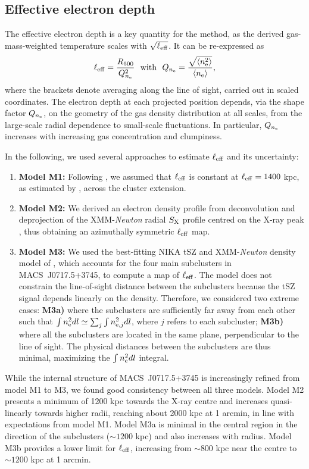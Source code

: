 \documentclass[twocolumn,traditabstract]{aa}
\def\xe {n_{\rm e}}
\begin{document}
\subsection{Effective electron depth}
The effective electron depth is a key quantity for the method, as the derived gas-mass-weighted temperature scales with $\sqrt{\ell_{\rm eff}}$. It can be re-expressed as
\begin{equation}
\ell_{\rm eff} = \frac{R_{500}}{Q_{n_{\rm e}}^2}~~{\rm with}~~Q_{n_{\rm e}} = \frac{ \sqrt{\langle \xe^2\rangle}}{ \langle\xe\rangle},
\label{eq:Q_ne}
\end{equation}
where the brackets denote averaging along the line of sight, carried out in scaled coordinates. The electron depth at each projected position depends, via the shape factor $Q_{n_{\rm e}}$, on the geometry of the gas density distribution at all scales, from the large-scale radial dependence to small-scale fluctuations. In particular, $Q_{n_{\rm e}}$ increases with increasing gas concentration and clumpiness.

In the following, we used several approaches to estimate $\ell_{\rm eff}$ and its uncertainty:
\begin{enumerate}
\item {\bf Model M1:} Following \cite{Sayers2013}, we assumed that $\ell_{\rm eff}$ is constant at $\ell_{\rm eff}=1400$ kpc, as estimated by \citet{Mroczkowski2012}, across the cluster extension. 
\item {\bf Model M2:} We derived an electron density profile from deconvolution and deprojection of the XMM-\textit{Newton} radial $S_{\rm X}$ profile centred on the X-ray peak \citep{Croston2006}, thus obtaining an azimuthally symmetric $\ell_{\rm eff}$ map. 
\item {\bf Model M3:} We used the best-fitting NIKA tSZ and XMM-\textit{Newton} density model of \cite{Adam2016b}, which accounts for the four main subclusters in \mbox{MACS~J0717.5+3745}, to compute a map of $\ell_{\rm eff}$. The model does not constrain the line-of-sight distance between the subclusters because the tSZ signal depends linearly on the density. Therefore, we considered two extreme cases: {\bf M3a)} where the subclusters are sufficiently far away from each other such that $\int n_{\rm e}^2 dl \simeq \sum_j \int n_{{\rm e},j}^2 dl$, where $j$ refers to each subcluster; {\bf M3b)} where all the subclusters are located in the same plane, perpendicular to the line of sight. The physical distances between the subclusters are thus minimal, maximizing the $\int n_{\rm e}^2 dl$ integral.
\end{enumerate}
While the internal structure of \mbox{MACS~J0717.5+3745} is increasingly refined from model M1 to M3, we found good consistency between all three models. Model M2 presents a minimum of 1200 kpc towards the X-ray centre and increases quasi-linearly towards higher radii, reaching about 2000 kpc at 1 arcmin, in line with expectations from model M1. Model M3a is minimal in the central region in the direction of the subclusters ($\sim 1200$ kpc) and also increases with radius. Model M3b provides a lower limit for $\ell_{\rm eff}$, increasing from $\sim 800$ kpc near the centre to $\sim 1200$ kpc at 1 arcmin.
\end{document}
